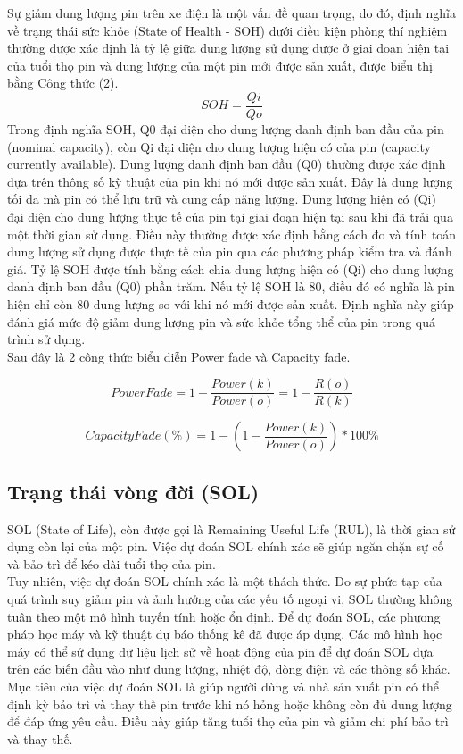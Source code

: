 \documentclass[a4paper,11pt]{article}
\theoremstyle{mytheor}
\begin{document}
Sự giảm dung lượng pin trên xe điện là một vấn đề quan trọng, do đó, định nghĩa về trạng thái sức khỏe (State of Health - SOH) dưới điều kiện phòng thí nghiệm thường được xác định là tỷ lệ giữa dung lượng sử dụng được ở giai đoạn hiện tại của tuổi thọ pin và dung lượng của một pin mới được sản xuất, được biểu thị bằng Công thức (2).\\
\[SOH = \frac{Qi}{Qo}\]
Trong định nghĩa SOH, Q0 đại diện cho dung lượng danh định ban đầu của pin (nominal capacity), còn Qi đại diện cho dung lượng hiện có của pin (capacity currently available).
Dung lượng danh định ban đầu (Q0) thường được xác định dựa trên thông số kỹ thuật của pin khi nó mới được sản xuất. Đây là dung lượng tối đa mà pin có thể lưu trữ và cung cấp năng lượng.
Dung lượng hiện có (Qi) đại diện cho dung lượng thực tế của pin tại giai đoạn hiện tại sau khi đã trải qua một thời gian sử dụng. Điều này thường được xác định bằng cách đo và tính toán dung lượng sử dụng được thực tế của pin qua các phương pháp kiểm tra và đánh giá.
Tỷ lệ SOH được tính bằng cách chia dung lượng hiện có (Qi) cho dung lượng danh định ban đầu (Q0) phần trăm. Nếu tỷ lệ SOH là 80, điều đó có nghĩa là pin hiện chỉ còn 80 dung lượng so với khi nó mới được sản xuất.
Định nghĩa này giúp đánh giá mức độ giảm dung lượng pin và sức khỏe tổng thể của pin trong quá trình sử dụng.\\
Sau đây là 2 công thức biểu diễn Power fade và Capacity fade. 

\[Power Fade = 1 - \frac{Power(k)}{Power(o)} = 1 - \frac{R(o)}{R(k)}\]

\[Capacity Fade(\%) = 1 - (1 - \frac{Power(k)}{Power(o)})*100 \%\]

\subsection{Trạng thái vòng đời (SOL)}

SOL (State of Life), còn được gọi là Remaining Useful Life (RUL), là thời gian sử dụng còn lại của một pin. Việc dự đoán SOL chính xác sẽ giúp ngăn chặn sự cố và bảo trì để kéo dài tuổi thọ của pin.\\
Tuy nhiên, việc dự đoán SOL chính xác là một thách thức. Do sự phức tạp của quá trình suy giảm pin và ảnh hưởng của các yếu tố ngoại vi, SOL thường không tuân theo một mô hình tuyến tính hoặc ổn định. Để dự đoán SOL, các phương pháp học máy và kỹ thuật dự báo thống kê đã được áp dụng. Các mô hình học máy có thể sử dụng dữ liệu lịch sử về hoạt động của pin để dự đoán SOL dựa trên các biến đầu vào như dung lượng, nhiệt độ, dòng điện và các thông số khác.\\
Mục tiêu của việc dự đoán SOL là giúp người dùng và nhà sản xuất pin có thể định kỳ bảo trì và thay thế pin trước khi nó hỏng hoặc không còn đủ dung lượng để đáp ứng yêu cầu. Điều này giúp tăng tuổi thọ của pin và giảm chi phí bảo trì và thay thế.\\
\end{document}
